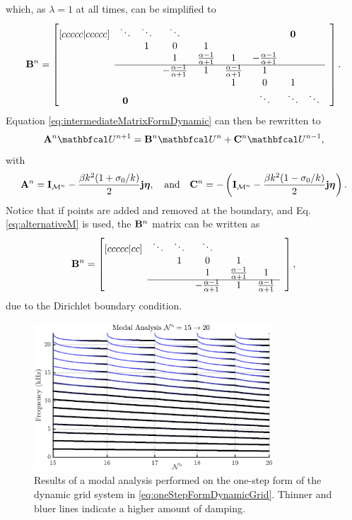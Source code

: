 which, as $\lambda = 1$ at all times, can be simplified to
\begin{equation}
    \mathbf{B}^n = \begin{bmatrix}[ccccc|ccccc]
        & \ddots& \ddots  &\ddots & & & & \mathbf{0} & & \\
        & & 1 & 0 & 1 & & & & & \\
        & & & 1 & \frac{\alpha - 1}{\alpha + 1}& 1 & -\frac{\alpha - 1}{\alpha + 1} & & \\ \cline{2-9}
        & & & -\frac{\alpha - 1}{\alpha + 1} & 1 & \frac{\alpha - 1}{\alpha + 1} & 1 & & & \\
        & & & & &1 & 0 & 1 & & \\
        & \mathbf{0} & & & &  &\ddots & \ddots &\ddots &
    \end{bmatrix}.
\end{equation}
Equation \eqref{eq:intermediateMatrixFormDynamic} can then be rewritten to 
\begin{equation}\label{eq:dynamicMatrixForm}
    \A^n \Ucal^{n+1} = \B^n \Ucal^n + \C^n\Ucal^{n-1},
\end{equation}
with
\begin{equation*}
    \mathbf{A}^n = \mathbf{I}_{\mathcal{M}^n} - \frac{\beta k^2 (1+\sigma_0/k)}{2}\mathbf{j}\boldsymbol{\eta},\quad \text{and} \quad \mathbf{C}^n = -\left(\mathbf{I}_{\mathcal{M}^n} - \frac{\beta k^2 (1-\sigma_0/k)}{2}\mathbf{j}\boldsymbol{\eta}\right).
\end{equation*}
Notice that if points are added and removed at the boundary, and Eq. \eqref{eq:alternativeM} is used, the $\mathbf{B}^n$ matrix can be written as
\begin{equation}
    \B^n = \begin{bmatrix}[ccccc|cc]
        & \ddots& \ddots  &\ddots & & & \\
        & & 1 & 0 & 1 & & \\
        & & & 1 & \frac{\alpha - 1}{\alpha + 1}& 1 & \\ \cline{2-6}
        & & & -\frac{\alpha - 1}{\alpha + 1} & 1 & \frac{\alpha - 1}{\alpha + 1} &
    \end{bmatrix},
\end{equation}
due to the Dirichlet boundary condition.
\begin{figure}[h]
    \centering
    \includegraphics[width=0.8\textwidth]{figures/contributions/dynamicgrid/modalAnalysisOneStep.eps}\caption{Results of a modal analysis performed on the one-step form of the dynamic grid system in \eqref{eq:oneStepFormDynamicGrid}. Thinner and bluer lines indicate a higher amount of damping.\label{fig:modalAnalysisOneStep}}
\end{figure}

